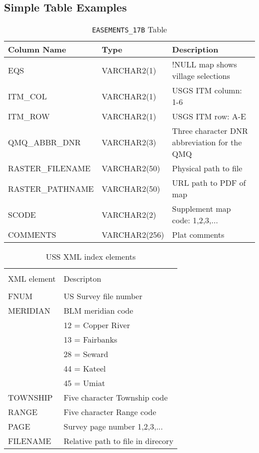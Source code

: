 \documentclass[12pt,letterpaper,dvips]{article}
\newcommand{\cmd}[1]{\texttt{#1}}
\begin{document}
\subsection{Simple Table Examples}
\begin{table}[htb]
\begin{tabular}{|p{}|p{}|p{}|}\hline 
Column Name&Type&Description\\ 
\hline
EQS&VARCHAR2(1)&!NULL map shows village selections\\
ITM\_COL&VARCHAR2(1)&USGS ITM column: 1-6\\
ITM\_ROW&VARCHAR2(1)&USGS ITM row: A-E\\
QMQ\_ABBR\_DNR&VARCHAR2(3)&Three character DNR abbreviation for the QMQ\\
RASTER\_FILENAME&VARCHAR2(50)&Physical path to file\\
RASTER\_PATHNAME&VARCHAR2(50)&URL path to PDF of map\\
SCODE&VARCHAR2(2)&Supplement map code: 1,2,3,...\\
COMMENTS&VARCHAR2(256)&Plat comments\\
\hline
\end{tabular}
\caption {\cmd{EASEMENTS\_17B} Table}
\label{table:easements_17b}
\end{table}

\begin{table}[htb]
\begin{center}
\begin{tabular*}{\textwidth}{@{}p{}@{}p{}}
\hline
\hline\\[-2.5ex]
XML element&Descripton\\
\hline
\hline\\[-1.5ex]   %
FNUM&US Survey file number\\ 
MERIDIAN&BLM meridian code\\
&\hspace{10pt}12 = Copper River\\
&\hspace{10pt}13 = Fairbanks\\
&\hspace{10pt}28 = Seward\\
&\hspace{10pt}44 = Kateel\\
&\hspace{10pt}45 = Umiat\\
TOWNSHIP&Five character Township code\\
RANGE&Five character Range code\\
PAGE&Survey page number 1,2,3,...\\
FILENAME&Relative path to file in direcory\\[1.5ex]
\hline
\end{tabular*}
\caption {USS XML index elements}
\label{table:uss-index}
\end{center}
\end{table}
\end{document}
